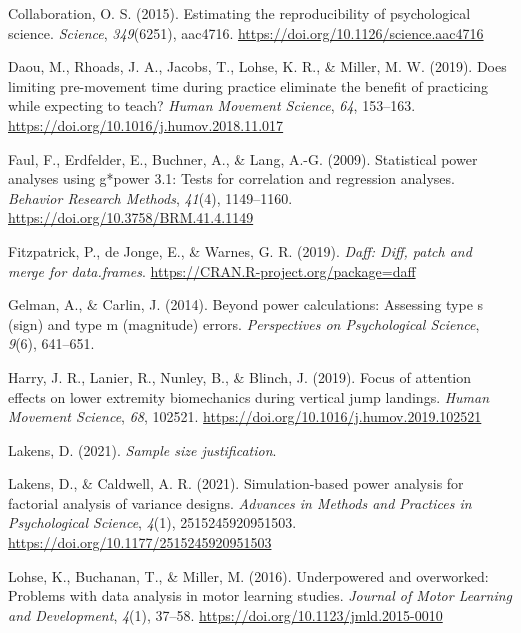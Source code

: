\documentclass[
  doc, donotrepeattitle,floatsintext]{apa7}
\newlength{\cslhangindent}
\newlength{\cslentryspacingunit} %
\newenvironment{CSLReferences}[2] %
 {%
  \setlength{\parindent}{0pt}
  \ifodd #1
  \let\oldpar\par
  \def\par{\hangindent=\cslhangindent\oldpar}
  \fi
  \setlength{\parskip}{#2\cslentryspacingunit}
 }%
 {}
\begin{document}
\begin{CSLReferences}{1}{0}
\leavevmode{}%
Collaboration, O. S. (2015). Estimating the reproducibility of psychological science. \emph{Science}, \emph{349}(6251), aac4716. \url{https://doi.org/10.1126/science.aac4716}

\leavevmode{}%
Daou, M., Rhoads, J. A., Jacobs, T., Lohse, K. R., \& Miller, M. W. (2019). Does limiting pre-movement time during practice eliminate the benefit of practicing while expecting to teach? \emph{Human Movement Science}, \emph{64}, 153--163. \url{https://doi.org/10.1016/j.humov.2018.11.017}

\leavevmode{}%
Faul, F., Erdfelder, E., Buchner, A., \& Lang, A.-G. (2009). Statistical power analyses using g*power 3.1: Tests for correlation and regression analyses. \emph{Behavior Research Methods}, \emph{41}(4), 1149--1160. \url{https://doi.org/10.3758/BRM.41.4.1149}

\leavevmode{}%
Fitzpatrick, P., de Jonge, E., \& Warnes, G. R. (2019). \emph{Daff: Diff, patch and merge for data.frames}. \url{https://CRAN.R-project.org/package=daff}

\leavevmode{}%
Gelman, A., \& Carlin, J. (2014). Beyond power calculations: Assessing type s (sign) and type m (magnitude) errors. \emph{Perspectives on Psychological Science}, \emph{9}(6), 641--651.

\leavevmode{}%
Harry, J. R., Lanier, R., Nunley, B., \& Blinch, J. (2019). Focus of attention effects on lower extremity biomechanics during vertical jump landings. \emph{Human Movement Science}, \emph{68}, 102521. \url{https://doi.org/10.1016/j.humov.2019.102521}

\leavevmode{}%
Lakens, D. (2021). \emph{Sample size justification}.

\leavevmode{}%
Lakens, D., \& Caldwell, A. R. (2021). Simulation-based power analysis for factorial analysis of variance designs. \emph{Advances in Methods and Practices in Psychological Science}, \emph{4}(1), 2515245920951503. \url{https://doi.org/10.1177/2515245920951503}

\leavevmode{}%
Lohse, K., Buchanan, T., \& Miller, M. (2016). Underpowered and overworked: Problems with data analysis in motor learning studies. \emph{Journal of Motor Learning and Development}, \emph{4}(1), 37--58. \url{https://doi.org/10.1123/jmld.2015-0010}


\end{CSLReferences}
\end{document}
